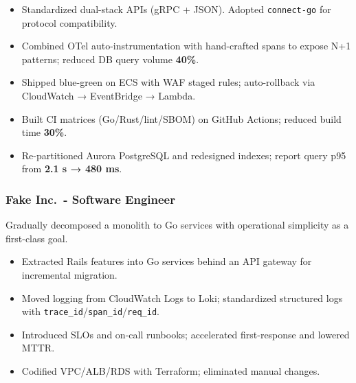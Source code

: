 \documentclass[
  10pt,
  a4paper,
]{extarticle}
\providecommand{\tightlist}{%
  \setlength{\itemsep}{0pt}\setlength{\parskip}{0pt}}
\begin{document}
\begin{itemize}
\tightlist
\item
  Standardized dual-stack APIs (gRPC + JSON). Adopted
  \texttt{connect-go} for protocol compatibility.
\item
  Combined OTel auto-instrumentation with hand-crafted spans to expose
  N+1 patterns; reduced DB query volume \textbf{40\%}.
\item
  Shipped blue-green on ECS with WAF staged rules; auto-rollback via
  CloudWatch → EventBridge → Lambda.
\item
  Built CI matrices (Go/Rust/lint/SBOM) on GitHub Actions; reduced build
  time \textbf{30\%}.
\item
  Re-partitioned Aurora PostgreSQL and redesigned indexes; report query
  p95 from \textbf{2.1 s → 480 ms}.
\end{itemize}

\subsubsection{Fake Inc.~- Software
Engineer}\label{fake-inc.---software-engineer}

%
  {\selectfont
  \noindent\makebox[\linewidth]{%
    \textcolor{black}{Permanent}\hfill
  }}\par{}

%
  {\selectfont
  \noindent{}}\par{}

Gradually decomposed a monolith to Go services with operational
simplicity as a first-class goal.

\begin{itemize}
\tightlist
\item
  Extracted Rails features into Go services behind an API gateway for
  incremental migration.
\item
  Moved logging from CloudWatch Logs to Loki; standardized structured
  logs with \texttt{trace\_id}/\texttt{span\_id}/\texttt{req\_id}.
\item
  Introduced SLOs and on-call runbooks; accelerated first-response and
  lowered MTTR.
\item
  Codified VPC/ALB/RDS with Terraform; eliminated manual changes.
\end{itemize}
\end{document}
